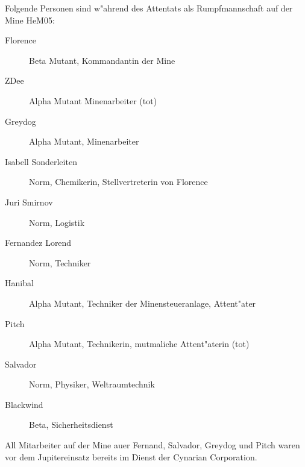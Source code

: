 
Folgende Personen sind w"ahrend des Attentats als Rumpfmannschaft auf der Mine HeM05:

\begin{description}
    \item[Florence] Beta Mutant, Kommandantin der Mine    
    \item[ZDee] Alpha Mutant Minenarbeiter (tot)
    \item[Greydog] Alpha Mutant, Minenarbeiter
    \item[Isabell Sonderleiten] Norm, Chemikerin, Stellvertreterin von Florence
    \item[Juri Smirnov] Norm, Logistik
    \item[Fernandez Lorend] Norm, Techniker
    \item[Hanibal] Alpha Mutant, Techniker der Minensteueranlage, Attent"ater
    \item[Pitch] Alpha Mutant, Technikerin, mutma\3liche Attent"aterin (tot)
    \item[Salvador] Norm, Physiker, Weltraumtechnik
    \item[Blackwind] Beta, Sicherheitsdienst
\end{description}

All Mitarbeiter auf der Mine au\3er Fernand, Salvador, Greydog und Pitch waren vor dem Jupitereinsatz bereits im Dienst der Cynarian Corporation.